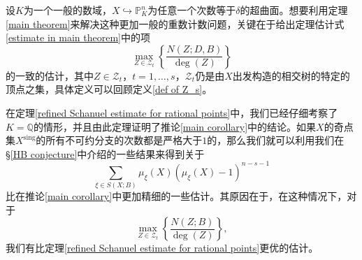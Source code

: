 
设$K$为一个一般的数域，$X \hookrightarrow \mathbb{P}^n_K$为任意一个次数等于$\delta$的超曲面。想要利用定理\ref{main theorem}来解决这种更加一般的重数计数问题，关键在于给出定理估计式\eqref{estimate in main theorem}中的项
\begin{equation}
\max_{Z \in \mathcal{Z}_t} \left\{ \frac{N(Z;D,B)}{\deg(Z)} \right\}
\end{equation}
的一致的估计，其中$Z \in \mathcal{Z}_t$，$t = 1,\ldots,s$，$\mathcal{Z}_t$仍是由$X$出发构造的相交树的特定的顶点之集，具体定义可以回顾定义\ref{def of Z_s}。

在定理\ref{refined Schanuel estimate for rational points}中，我们已经仔细考察了$K = \mathbb{Q}$的情形，并且由此定理证明了推论\ref{main corollary}中的结论。如果$X$的奇点集$X^{\mathrm{sing}}$的所有不可约分支的次数都是严格大于$1$的，那么我们就可以利用我们在\S\ref{HB conjecture}中介绍的一些结果来得到关于
\begin{equation}
\sum_{\xi \in S(X;B)} \mu_\xi(X)(\mu_\xi(X)-1)^{n-s-1}
\end{equation}
比在推论\ref{main corollary}中更加精细的一些估计。其原因在于，在这种情况下，对于
\begin{equation}
\max\limits_{Z\in\mathcal{Z}_t} \left\{ \frac{N(Z;B)}{\deg(Z)} \right\},
\end{equation}
我们有比定理\ref{refined Schanuel estimate for rational points}更优的估计。


